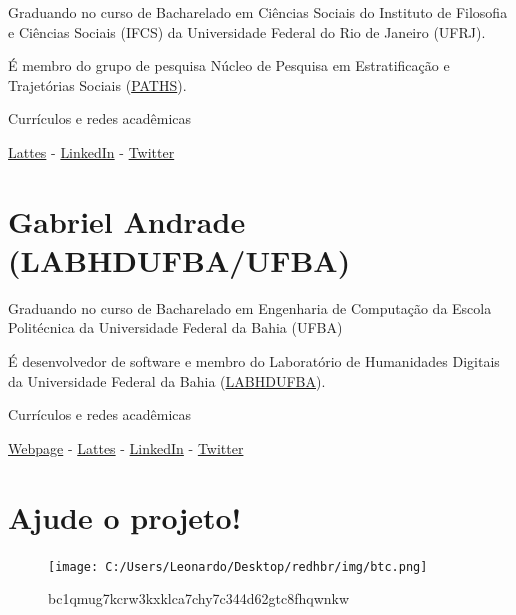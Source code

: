 \documentclass[
]{book}
\begin{document}
Graduando no curso de Bacharelado em Ciências Sociais do Instituto de Filosofia e Ciências Sociais (IFCS) da Universidade Federal do Rio de Janeiro (UFRJ).

É membro do grupo de pesquisa Núcleo de Pesquisa em Estratificação e Trajetórias Sociais (\href{https://www.facebook.com/paths.research/}{PATHS}).

Currículos e redes acadêmicas

\href{http://lattes.cnpq.br/9834413442426550}{Lattes} - \href{https://www.linkedin.com/in/daniel-mendes-251212176/}{LinkedIn} - \href{https://twitter.com/danielmnds34}{Twitter}

\hypertarget{gabriel-andrade-labhdufbaufba}{%
\section{Gabriel Andrade (LABHDUFBA/UFBA)}\label{gabriel-andrade-labhdufbaufba}}

Graduando no curso de Bacharelado em Engenharia de Computação da Escola Politécnica da Universidade Federal da Bahia (UFBA)

É desenvolvedor de software e membro do Laboratório de Humanidades Digitais da Universidade Federal da Bahia (\href{http://www.labhd.ufba.br/}{LABHDUFBA}).

Currículos e redes acadêmicas

\href{https://gabrielsandrade.github.io}{Webpage} - \href{http://lattes.cnpq.br/4915378425369073}{Lattes} - \href{https://www.linkedin.com/in/gabriel-andrade-633996108}{LinkedIn} - \href{https://twitter.com/ga_brieell_}{Twitter}

\hypertarget{ajude-o-projeto}{%
\section{Ajude o projeto!}\label{ajude-o-projeto}}

\begin{figure}
\centering
\texttt{[image: C:/Users/Leonardo/Desktop/redhbr/img/btc.png]}
\caption{bc1qmug7kcrw3kxklca7chy7c344d62gtc8fhqwnkw}
\end{figure}

  
\end{document}
